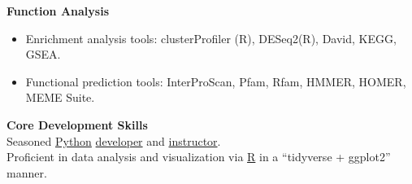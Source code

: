 \textbf{Function Analysis}
\begin{itemize}
    \item Enrichment analysis tools: clusterProfiler (R), DESeq2(R), David, KEGG, GSEA.
    \item Functional prediction tools: InterProScan, Pfam, Rfam, HMMER, HOMER, MEME Suite.
\end{itemize}


\textbf{Core Development Skills}\\

Seasoned \underline{Python} \href{https://github.com/hermanzhaozzzz}{developer} 
and \href{https://www.bioinfo.info/p/t_pc/goods_pc_detail/goods_detail/course_2SvfNlIVzrKfOcexHk9Nute5Bhd}{instructor}.\\
Proficient in data analysis and visualization via \underline{R} in a ``tidyverse + ggplot2'' manner.
  
  
  


